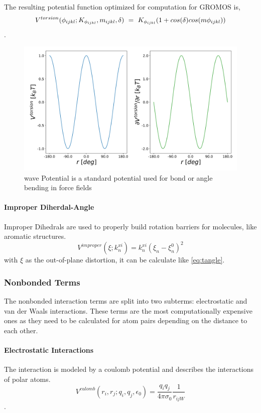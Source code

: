The resulting potential function optimized for computation for GROMOS is,
\begin{equation}
    V^{torsion}(\phi_{ijkl}; K_{\phi_{ijkl}}, m_{ijkl}, \delta)~=~K_{\phi_{ijkl}}(1+cos(\delta)cos(m \phi_{ijkl})) \\
\end{equation}. \cite{Oostenbrink2004}
\begin{figure}[h]
    \centering
    \includegraphics[width=\textwidth]{fig/ForceField/torsion.png}
    \caption{wave Potential is a standard potential used for bond or angle bending in force fields}
    \label{fig:torsion}
\end{figure}

\paragraph{Improper Diherdal-Angle}
Improper Dihedrals are used to properly build rotation barriers for molecules, like aromatic structures.\cite{Blondel1996}
\begin{equation}
    V^{improper}(\xi; k^{xi}_n) = k^{xi}_n (\xi_n - \xi^0_n)^2
\end{equation}
with $\xi$ as the out-of-plane distortion, it can be calculate like \ref{eq:tangle}. \cite{Oostenbrink2004}

\subsubsection{Nonbonded Terms}
The nonbonded interaction terms are split into two subterms: electrostatic and van der Waals interactions. These terms are the most computationally expensive ones as they need to be calculated for atom pairs depending on the distance to each other.

\paragraph{Electrostatic Interactions}
The interaction is modeled by a coulomb potential and describes the interactions of polar atoms.\cite{}
\begin{equation}
    V^{culomb}(r_i, r_j; q_i, q_j, \epsilon_0)  = \frac{q_i q_j}{4 \pi \sigma_0} \frac{1}{r_{ijW}}
\end{equation}. \cite{}

